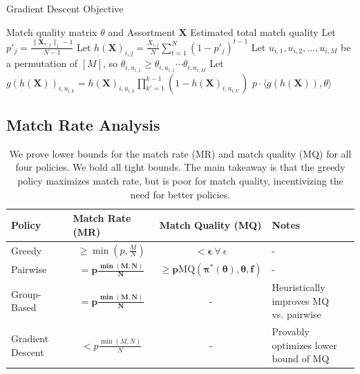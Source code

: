 \documentclass[11pt]{article}
\begin{document}
\begin{algorithm}[h]
   \caption{Gradient Descent Objective}
\begin{algorithmic}
     Match quality matrix $\theta$ and Assortment $\mathbf{X}$
     Estimated total match quality
    \STATE Let $p'_{j} = \frac{\lVert \mathbf{X}_{*,j} \rVert_{1}-1}{N-1}$
    \STATE Let $h(\mathbf{X})_{i,j} = \frac{X_{i,j}}{N} \sum_{t=1}^{N} (1-p'_{j})^{t-1}$ 
    \STATE Let $u_{i,1},u_{i,2},\ldots,u_{i,M}$ be a permutation of $[M]$, so $\theta_{i,u_{i,1}} \geq \theta_{i,u_{i,1}} \cdots \theta_{i,u_{i,M}}$
    \STATE Let $g(h(\mathbf{X}))_{i,u_{i,k}} = h(\mathbf{X})_{i,u_{i,k}} \prod_{k'=1}^{k-1} (1-h(\mathbf{X})_{i,u_{i,k'}})$
    \RETURN $p \cdot \langle g(h(\mathbf{X})), \theta \rangle$
\end{algorithmic}
\label{alg:provider}
\end{algorithm}

\subsection{Match Rate Analysis}
\label{sec:match_rate}

\begin{table}[tb]
\centering
\caption{We prove lower bounds for the match rate (MR) and match quality (MQ) for all four policies. 
We bold all tight bounds. 
The main takeaway is that the greedy policy maximizes match rate, but is poor for match quality, incentivizing the need for better policies.}
\begin{tabular}{@{}lccl@{}}
\toprule
Policy       & \multicolumn{1}{l}{Match Rate (MR)}    & \multicolumn{1}{l}{Match Quality (MQ)} & Notes                                             \\ \midrule
Greedy           & $\geq \min(p,\frac{M}{N})$     & $< \boldsymbol{\epsilon} \ \forall\  \epsilon$                        & -                                \\
Pairwise         & $ = \mathbf{p \frac{\min(M,N)}{N}}$           & $\geq  \mathbf{p \mathrm{MQ}(\pi^{*}(\theta),\theta,f)}$                               &            -                                       \\
Group-Based      & $= \mathbf{p \frac{\min(M,N)}{N}}$           & -                                 & \makecell[l]{Heuristically improves MQ \\ vs. pairwise} \\
Gradient Descent & $< p \frac{\min(M,N)}{N}$ & -                                 & \makecell[l]{Provably optimizes lower \\ bound of MQ} \\ \bottomrule
\end{tabular}
\label{tab:policy_summary}
\end{table}
\end{document}
